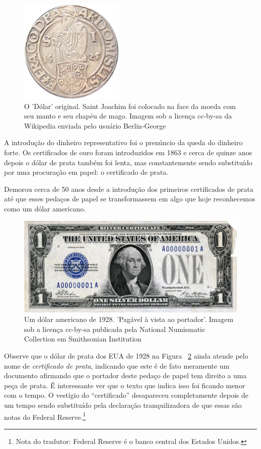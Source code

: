 \begin{figure}
  \centering
  \includegraphics[width=5cm]{assets/images/joachimsthaler.png}
  \caption{O 'Dólar' original. Saint Joachim foi colocado na face da moeda com seu manto e seu chapéu de mago. Imagem sob a licença cc-by-sa da Wikipedia enviada pelo usuário Berlin-George}
  \label{fig:joachimsthaler}
\end{figure}

A introdução do dinheiro representativo foi o prenúncio da queda do dinheiro forte. Os certificados de ouro foram introduzidos em 1863 e cerca de quinze anos depois o dólar de prata também foi lenta, mas constantemente sendo substituído por uma procuração em papel: o certificado de prata. \cite{wiki:silver-certificate}

Demorou cerca de 50 anos desde a introdução dos primeiros certificados de prata até que esses pedaços de papel se transformassem em algo que hoje reconhecemos como um dólar americano.

\begin{figure}
  \centering
  \includegraphics{assets/images/us-silver-dollar-note-smaller.png}
  \caption{Um dólar americano de 1928. 'Pagável à vista ao portador'. Imagem sob a licença cc-by-sa publicada pela National Numismatic Collection em Smithsonian Institution}
  \label{fig:us-silver-dollar-note-smaller}
\end{figure}

Observe que o dólar de prata dos EUA de 1928 na Figura ~\ref{fig:us-silver-dollar-note-smaller} ainda atende pelo nome de \textit{certificado de prata}, indicando que este é de fato meramente um documento afirmando que o portador deste pedaço de papel tem direito a uma peça de prata. É interessante ver que o texto que indica isso foi ficando menor com o tempo. O vestígio do \enquote{certificado} desapareceu completamente depois de um tempo sendo substituído pela declaração tranquilizadora de que essas são notas do Federal Reserve.\footnote{Nota do tradutor: Federal Reserve é o banco central dos Estados Unidos.}

